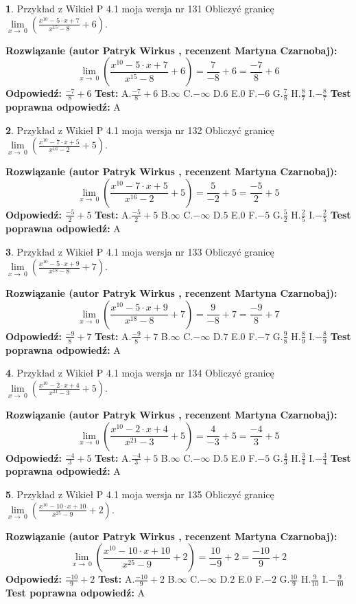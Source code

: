 \documentclass[12pt, a4paper]{article}
\theoremstyle{definition} %
\newtheorem{zad}{}
\newcommand{\zadStart}[1]{\begin{zad}#1\newline}
\newcommand{\zadStop}{\end{zad}}
\newcommand{\rozwStart}[2]{\noindent \textbf{Rozwiązanie (autor #1 , recenzent #2): }\newline}
\newcommand{\rozwStop}{\newline}
\newcommand{\odpStart}{\noindent \textbf{Odpowiedź:}\newline}
\newcommand{\odpStop}{\newline}
\newcommand{\testStart}{\noindent \textbf{Test:}\newline}
\newcommand{\testStop}{\newline}
\newcommand{\kluczStart}{\noindent \textbf{Test poprawna odpowiedź:}\newline}
\newcommand{\kluczStop}{\newline}
\begin{document}
\zadStart{Przykład z Wikieł P 4.1 moja wersja nr 131}
Obliczyć granicę $\lim\limits_{x\to\ 0}(\frac{x^{10}-5 \cdot x +7}{x^{15}-8}+6)$.
\zadStop
\rozwStart{Patryk Wirkus}{Martyna Czarnobaj}
$$\lim\limits_{x\to\ 0}(\frac{x^{10}-5 \cdot x +7}{x^{15}-8}+6)=\frac{7}{-8}+6=\frac{-7}{8}+6$$
\rozwStop
\odpStart
$\frac{-7}{8}+6$
\odpStop
\testStart
A.$\frac{-7}{8}+6$
B.$\infty$
C.$-\infty$
D.$6$
E.$0$
F.$-6$
G.$\frac{7}{8}$
H.$\frac{8}{7}$
I.$-\frac{8}{7}$
\testStop
\kluczStart
A
\kluczStop



\zadStart{Przykład z Wikieł P 4.1 moja wersja nr 132}
Obliczyć granicę $\lim\limits_{x\to\ 0}(\frac{x^{10}-7 \cdot x +5}{x^{16}-2}+5)$.
\zadStop
\rozwStart{Patryk Wirkus}{Martyna Czarnobaj}
$$\lim\limits_{x\to\ 0}(\frac{x^{10}-7 \cdot x +5}{x^{16}-2}+5)=\frac{5}{-2}+5=\frac{-5}{2}+5$$
\rozwStop
\odpStart
$\frac{-5}{2}+5$
\odpStop
\testStart
A.$\frac{-5}{2}+5$
B.$\infty$
C.$-\infty$
D.$5$
E.$0$
F.$-5$
G.$\frac{5}{2}$
H.$\frac{2}{5}$
I.$-\frac{2}{5}$
\testStop
\kluczStart
A
\kluczStop



\zadStart{Przykład z Wikieł P 4.1 moja wersja nr 133}
Obliczyć granicę $\lim\limits_{x\to\ 0}(\frac{x^{10}-5 \cdot x +9}{x^{18}-8}+7)$.
\zadStop
\rozwStart{Patryk Wirkus}{Martyna Czarnobaj}
$$\lim\limits_{x\to\ 0}(\frac{x^{10}-5 \cdot x +9}{x^{18}-8}+7)=\frac{9}{-8}+7=\frac{-9}{8}+7$$
\rozwStop
\odpStart
$\frac{-9}{8}+7$
\odpStop
\testStart
A.$\frac{-9}{8}+7$
B.$\infty$
C.$-\infty$
D.$7$
E.$0$
F.$-7$
G.$\frac{9}{8}$
H.$\frac{8}{9}$
I.$-\frac{8}{9}$
\testStop
\kluczStart
A
\kluczStop



\zadStart{Przykład z Wikieł P 4.1 moja wersja nr 134}
Obliczyć granicę $\lim\limits_{x\to\ 0}(\frac{x^{10}-2 \cdot x +4}{x^{21}-3}+5)$.
\zadStop
\rozwStart{Patryk Wirkus}{Martyna Czarnobaj}
$$\lim\limits_{x\to\ 0}(\frac{x^{10}-2 \cdot x +4}{x^{21}-3}+5)=\frac{4}{-3}+5=\frac{-4}{3}+5$$
\rozwStop
\odpStart
$\frac{-4}{3}+5$
\odpStop
\testStart
A.$\frac{-4}{3}+5$
B.$\infty$
C.$-\infty$
D.$5$
E.$0$
F.$-5$
G.$\frac{4}{3}$
H.$\frac{3}{4}$
I.$-\frac{3}{4}$
\testStop
\kluczStart
A
\kluczStop



\zadStart{Przykład z Wikieł P 4.1 moja wersja nr 135}
Obliczyć granicę $\lim\limits_{x\to\ 0}(\frac{x^{10}-10 \cdot x +10}{x^{25}-9}+2)$.
\zadStop
\rozwStart{Patryk Wirkus}{Martyna Czarnobaj}
$$\lim\limits_{x\to\ 0}(\frac{x^{10}-10 \cdot x +10}{x^{25}-9}+2)=\frac{10}{-9}+2=\frac{-10}{9}+2$$
\rozwStop
\odpStart
$\frac{-10}{9}+2$
\odpStop
\testStart
A.$\frac{-10}{9}+2$
B.$\infty$
C.$-\infty$
D.$2$
E.$0$
F.$-2$
G.$\frac{10}{9}$
H.$\frac{9}{10}$
I.$-\frac{9}{10}$
\testStop
\kluczStart
A
\kluczStop
\end{document}
